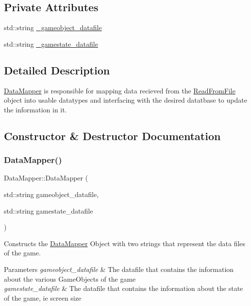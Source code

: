\subsection*{Private Attributes}
\begin{DoxyCompactItemize}
\item 
std\+::string \hyperlink{class_data_mapper_a7906ac7e6e95631428095246fcdefecb}{\+\_\+gameobject\+\_\+datafile}
\item 
std\+::string \hyperlink{class_data_mapper_ad64f65ef0ca4a3ed5e0ded4318ee3357}{\+\_\+gamestate\+\_\+datafile}
\end{DoxyCompactItemize}


\subsection{Detailed Description}
\hyperlink{class_data_mapper}{Data\+Mapper} is responsible for mapping data recieved from the \hyperlink{class_read_from_file}{Read\+From\+File} object into usable datatypes and interfacing with the desired datatbase to update the information in it. 

\subsection{Constructor \& Destructor Documentation}
\mbox{\label{class_data_mapper_a4603cf7c03ad31b454669ad61e64919f}} 
\subsubsection{\texorpdfstring{Data\+Mapper()}{DataMapper()}}
{\footnotesize\ttfamily Data\+Mapper\+::\+Data\+Mapper (\begin{DoxyParamCaption}\item[{std\+::string}]{gameobject\+\_\+datafile,  }\item[{std\+::string}]{gamestate\+\_\+datafile }\end{DoxyParamCaption})}



Constructs the \hyperlink{class_data_mapper}{Data\+Mapper} Object with two strings that represent the data files of the game. 


\begin{DoxyParams}{Parameters}
{\em gameobject\+\_\+datafile} & The datafile that contains the information about the various Game\+Objects of the game \\
\hline
{\em gamestate\+\_\+datafile} & The datafile that contains the information about the state of the game, ie screen size \\
\hline
\end{DoxyParams}


